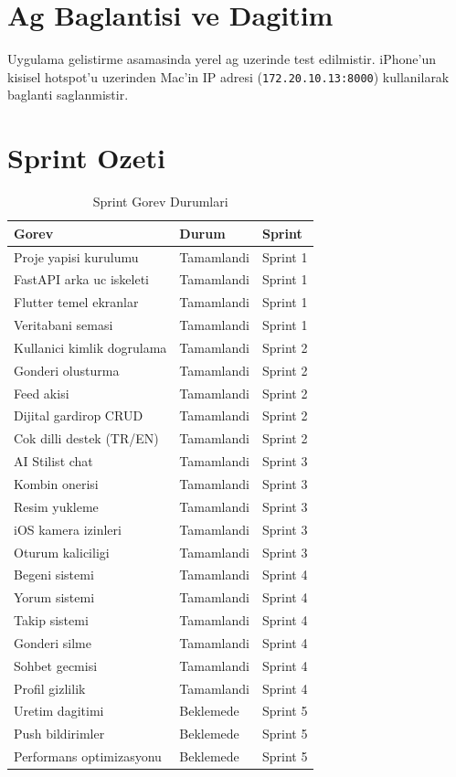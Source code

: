 \documentclass[conference]{IEEEtran}
\begin{document}
\section{Ag Baglantisi ve Dagitim}

Uygulama gelistirme asamasinda yerel ag uzerinde test edilmistir. iPhone'un kisisel hotspot'u uzerinden Mac'in IP adresi (\texttt{172.20.10.13:8000}) kullanilarak baglanti saglanmistir.

\section{Sprint Ozeti}

\begin{table}[h]
\caption{Sprint Gorev Durumlari}
\label{tab:sprint}
\centering
\begin{tabular}{lll}
\toprule
\textbf{Gorev} & \textbf{Durum} & \textbf{Sprint} \\
\midrule
Proje yapisi kurulumu & Tamamlandi & Sprint 1 \\
FastAPI arka uc iskeleti & Tamamlandi & Sprint 1 \\
Flutter temel ekranlar & Tamamlandi & Sprint 1 \\
Veritabani semasi & Tamamlandi & Sprint 1 \\
\midrule
Kullanici kimlik dogrulama & Tamamlandi & Sprint 2 \\
Gonderi olusturma & Tamamlandi & Sprint 2 \\
Feed akisi & Tamamlandi & Sprint 2 \\
Dijital gardirop CRUD & Tamamlandi & Sprint 2 \\
Cok dilli destek (TR/EN) & Tamamlandi & Sprint 2 \\
\midrule
AI Stilist chat & Tamamlandi & Sprint 3 \\
Kombin onerisi & Tamamlandi & Sprint 3 \\
Resim yukleme & Tamamlandi & Sprint 3 \\
iOS kamera izinleri & Tamamlandi & Sprint 3 \\
Oturum kaliciligi & Tamamlandi & Sprint 3 \\
\midrule
Begeni sistemi & Tamamlandi & Sprint 4 \\
Yorum sistemi & Tamamlandi & Sprint 4 \\
Takip sistemi & Tamamlandi & Sprint 4 \\
Gonderi silme & Tamamlandi & Sprint 4 \\
Sohbet gecmisi & Tamamlandi & Sprint 4 \\
Profil gizlilik & Tamamlandi & Sprint 4 \\
\midrule
Uretim dagitimi & Beklemede & Sprint 5 \\
Push bildirimler & Beklemede & Sprint 5 \\
Performans optimizasyonu & Beklemede & Sprint 5 \\
\bottomrule
\end{tabular}
\end{table}
\end{document}
